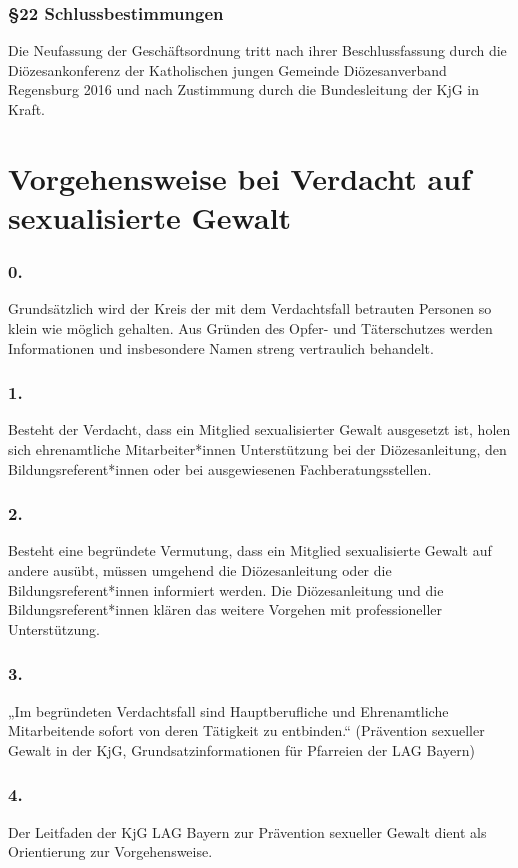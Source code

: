 \documentclass[12pt]{report}
\begin{document}
\begin{justify}
\subsection*{§22 Schlussbestimmungen}
Die Neufassung der Geschäftsordnung tritt nach ihrer Beschlussfassung durch die Diözesankonferenz der
Katholischen jungen Gemeinde Diözesanverband Regensburg 2016 und nach Zustimmung durch
die Bundesleitung der KjG in Kraft.


\chapter*{Vorgehensweise bei Verdacht auf sexualisierte Gewalt}
\subsection*{ 0.}
Grundsätzlich wird der Kreis der mit dem Verdachtsfall betrauten Personen so klein wie möglich gehalten.
Aus Gründen des Opfer- und Täterschutzes werden Informationen und insbesondere Namen  
streng vertraulich behandelt.
\subsection*{1.}
Besteht der Verdacht, dass ein Mitglied sexualisierter Gewalt ausgesetzt ist, holen sich ehrenamtliche
Mitarbeiter*innen Unterstützung bei der Diözesanleitung, den Bildungsreferent*innen oder bei  
ausgewiesenen Fachberatungsstellen.
\subsection*{2.}
Besteht eine begründete Vermutung, dass ein Mitglied sexualisierte Gewalt auf andere ausübt, müssen
umgehend die Diözesanleitung oder die Bildungsreferent*innen informiert werden. Die Diözesanleitung
und die Bildungsreferent*innen klären das weitere Vorgehen mit professioneller Unterstützung.
\subsection*{3.}
„Im begründeten Verdachtsfall sind Hauptberufliche und Ehrenamtliche Mitarbeitende sofort von  
deren Tätigkeit zu entbinden.“
(Prävention sexueller Gewalt in der KjG, Grundsatzinformationen für Pfarreien der LAG Bayern)
\subsection*{4.}
Der Leitfaden der KjG LAG Bayern zur Prävention sexueller Gewalt dient als Orientierung zur Vorgehensweise.

\end{justify}
\end{document}
